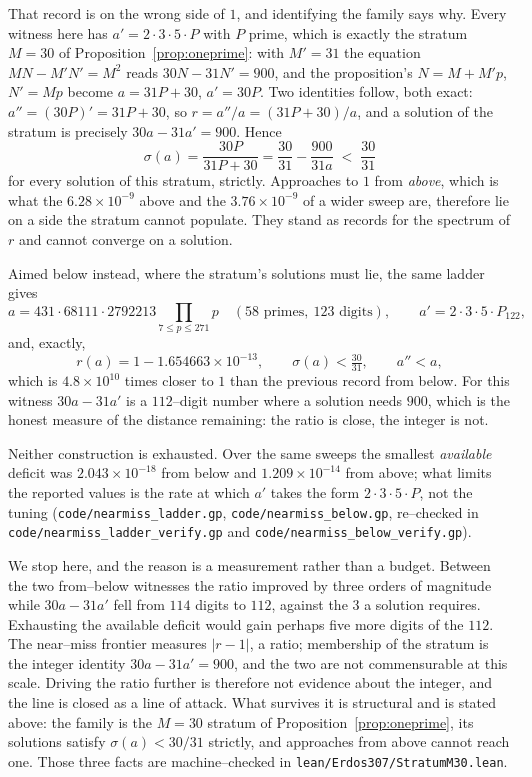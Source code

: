\documentclass[11pt]{article}
\theoremstyle{definition}
\begin{document}
That record is on the wrong side of $1$, and identifying the family says why. Every witness here has
$a'=2\cdot3\cdot5\cdot P$ with $P$ prime, which is exactly the stratum $M=30$ of
Proposition~\textup{\ref{prop:oneprime}}: with $M'=31$ the equation $MN-M'N'=M^2$ reads
$30N-31N'=900$, and the proposition's $N=M+M'p$, $N'=Mp$ become $a=31P+30$, $a'=30P$. Two identities
follow, both exact: $a''=(30P)'=31P+30$, so $r=a''/a=(31P+30)/a$, and a solution of the stratum is
precisely $30a-31a'=900$. Hence
\[ \sigma(a)=\frac{30P}{31P+30}=\frac{30}{31}-\frac{900}{31a}\;<\;\frac{30}{31} \]
for every solution of this stratum, strictly. Approaches to $1$ from \emph{above}, which is what the
$6.28\times10^{-9}$ above and the $3.76\times10^{-9}$ of a wider sweep are, therefore lie on a side
the stratum cannot populate. They stand as records for the spectrum of $r$ and cannot converge on a
solution.

Aimed below instead, where the stratum's solutions must lie, the same ladder gives
\[ a=431\cdot68111\cdot2792213\!\!\prod_{7\le p\le271}\!\!p \quad(58\text{ primes},\ 123\text{ digits}),
   \qquad a'=2\cdot3\cdot5\cdot P_{122}, \]
and, exactly,
\[ r(a)=1-1.654663\times10^{-13},\qquad \sigma(a)<\tfrac{30}{31},\qquad a''<a, \]
which is $4.8\times10^{10}$ times closer to $1$ than the previous record from below. For this witness
$30a-31a'$ is a $112$--digit number where a solution needs $900$, which is the honest measure of the
distance remaining: the ratio is close, the integer is not.

Neither construction is exhausted. Over the same sweeps the smallest \emph{available} deficit was
$2.043\times10^{-18}$ from below and $1.209\times10^{-14}$ from above; what limits the reported values
is the rate at which $a'$ takes the form $2\cdot3\cdot5\cdot P$, not the tuning
\textup{(\texttt{code/nearmiss\_ladder.gp}, \texttt{code/nearmiss\_below.gp}, re--checked in
\texttt{code/nearmiss\_ladder\_verify.gp} and \texttt{code/nearmiss\_below\_verify.gp})}.

We stop here, and the reason is a measurement rather than a budget. Between the two from--below
witnesses the ratio improved by three orders of magnitude while $30a-31a'$ fell from $114$ digits to
$112$, against the $3$ a solution requires. Exhausting the available deficit would gain perhaps five
more digits of the $112$. The near--miss frontier measures $|r-1|$, a ratio; membership of the
stratum is the integer identity $30a-31a'=900$, and the two are not commensurable at this scale.
Driving the ratio further is therefore not evidence about the integer, and the line is closed as a
line of attack. What survives it is structural and is stated above: the family is the $M=30$ stratum
of Proposition~\ref{prop:oneprime}, its solutions satisfy $\sigma(a)<30/31$ strictly, and approaches
from above cannot reach one. Those three facts are machine--checked in
\texttt{lean/Erdos307/StratumM30.lean}.
\end{document}
